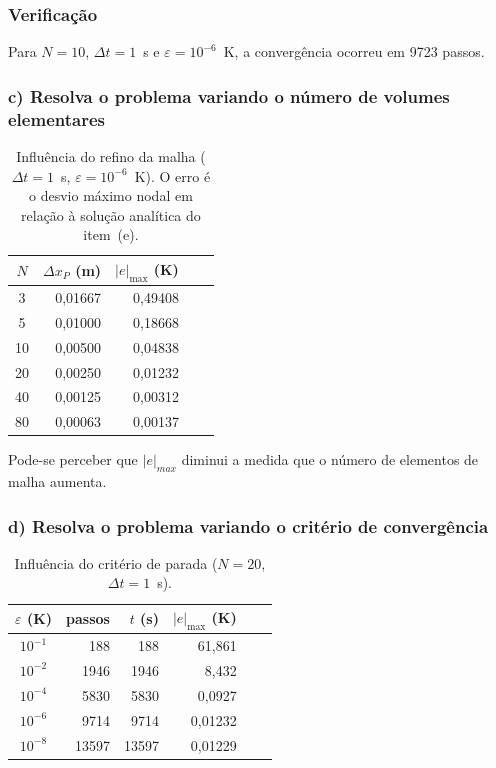 \subsubsection*{Verificação}

Para $N=10$, $\Delta t=1$~s e $\varepsilon=10^{-6}$~K, a convergência ocorreu
em 9723 passos.

\vspace{0.5cm}

\subsubsection*{c) Resolva o problema variando o número de volumes elementares}

\begin{table}[H]
\centering
\caption{Influência do refino da malha ($\Delta t=1$~s,
$\varepsilon=10^{-6}$~K). O erro é o desvio máximo nodal em relação à solução
analítica do item~(e).}
\begin{tabular}{crrrr}
\hline
$N$ & $\Delta x_P$ (m) & $|e|_{\max}$ (K)\\
\hline
3  & 0,01667 & 0,49408\\
5  & 0,01000 & 0,18668\\
10 & 0,00500 & 0,04838\\
20 & 0,00250 & 0,01232\\
40 & 0,00125 & 0,00312\\
80 & 0,00063 & 0,00137\\
\hline
\end{tabular}
\end{table}

Pode-se perceber que $|e|_{max}$ diminui a medida que o número de elementos de malha aumenta.

\vspace{0.5cm}

\subsubsection*{d) Resolva o problema variando o critério de convergência}

\begin{table}[H]
\centering
\caption{Influência do critério de parada ($N=20$, $\Delta t=1$~s).}
\begin{tabular}{crrrrr}
\hline
$\varepsilon$ (K) & passos & $t$ (s) & $|e|_{\max}$ (K)\\
\hline
$10^{-1}$ &   188 &   188 & 61,861\\
$10^{-2}$ &  1946 &  1946 & 8,432\\
$10^{-4}$ &  5830 &  5830 & 0,0927\\
$10^{-6}$ &  9714 &  9714 & 0,01232\\
$10^{-8}$ & 13597 & 13597 & 0,01229\\
\hline
\end{tabular}
\end{table}

